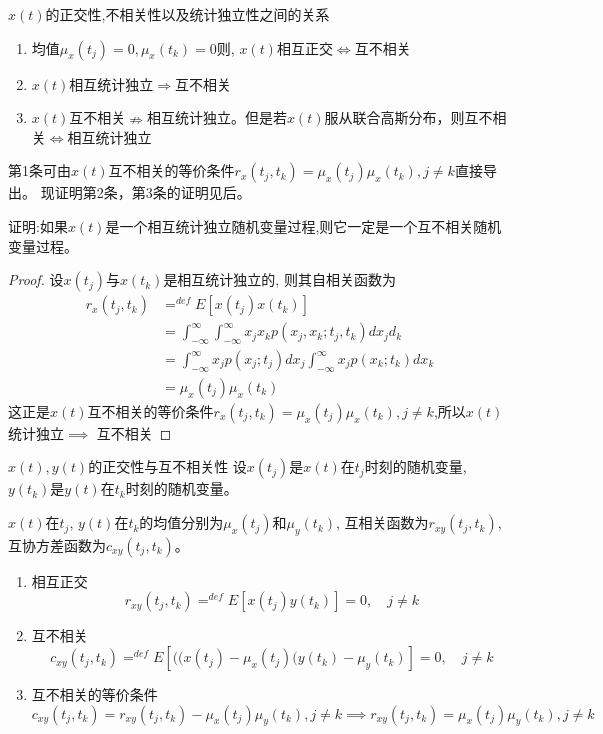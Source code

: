 \begin{frame}{$x(t)$的正交性,不相关性以及统计独立性之间的关系}
\begin{enumerate}
\item 均值$\mu_x(t_j)=0,\mu_x(t_k)=0$则, $x(t)$相互正交$\Leftrightarrow$互不相关\\
\item $x(t)$相互统计独立$\Rightarrow$互不相关
\item $x(t)$互不相关$\nRightarrow$相互统计独立。但是若$x(t)$服从联合高斯分布，则互不相关$\Leftrightarrow$相互统计独立
\end{enumerate}
第1条可由$x(t)$互不相关的等价条件$r_x(t_j,t_k)=\mu_x(t_j)\mu_x(t_k),j\ne k $直接导出。
现证明第2条，第3条的证明见后。
\end{frame}

\begin{frame}
证明:如果$x(t)$是一个相互统计独立随机变量过程,则它一定是一个互不相关随机变量过程。
\begin{proof}%
	设$x(t_j)$与$x(t_k)$是相互统计独立的, 则其自相关函数为
	\begin{align*}
	r_x(t_j,t_k)&\mathop{=}^{def}E[x(t_j)x(t_k)]\\
	&=\int_{-\infty}^{\infty}\int_{-\infty}^{\infty}x_jx_kp(x_j,x_k;t_j,t_k)dx_jd_k\\
	&=\int_{-\infty}^{\infty}x_jp(x_j;t_j)dx_j\int_{-\infty}^{\infty}x_jp(x_k;t_k)dx_k\\
	&=\mu_x(t_j)\mu_x(t_k)
	\end{align*}
	这正是$x(t)$互不相关的等价条件$r_x(t_j,t_k)=\mu_x(t_j)\mu_x(t_k),j\ne k $,所以$x(t)$统计独立$\implies$ 互不相关
\end{proof}
\end{frame}

\begin{frame}{$x(t), y(t)$的正交性与互不相关性}
设$x(t_j)$是$x(t)$在$t_j$时刻的随机变量, $y(t_k)$是$y(t)$在$t_k$时刻的随机变量。
\begin{definition}
	$x(t)$在$t_j$, $y(t)$在$t_k$的均值分别为$\mu_x(t_j)$和$\mu_y(t_k)$, 互相关函数为$r_{xy}(t_j,t_k)$, 互协方差函数为$c_{xy}(t_j,t_k)$。
	\begin{enumerate}
		\item 相互正交
		$$r_{xy}(t_j,t_k)\mathop{=}^{def}E[x(t_j)y(t_k)]=0, \quad j\ne k$$
		\item 互不相关
		$$c_{xy}(t_j,t_k)\mathop{=}^{def}E[((x(t_j)-\mu_x(t_j)(y(t_k)-\mu_y(t_k)]=0, \quad j\ne k$$
		\item 互不相关的等价条件
		$$c_{xy}(t_j,t_k)=r_{xy}(t_j,t_k)-\mu_x(t_j)\mu_y(t_k), j\ne k \implies r_{xy}(t_j,t_k)=\mu_x(t_j)\mu_y(t_k),j\ne k $$
	\end{enumerate}	
\end{definition}
\end{frame}

